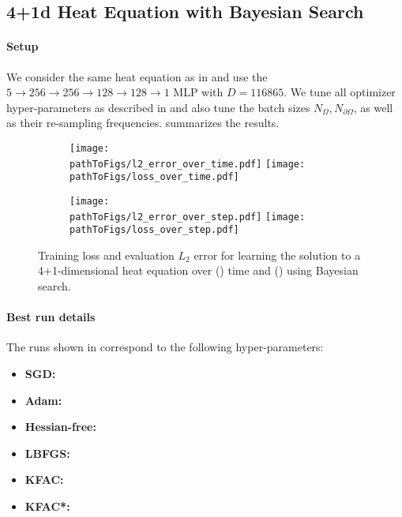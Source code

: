 \subsection{4+1d Heat Equation with Bayesian Search}\label{sec:4d-heat-bayes-app}

\paragraph{Setup} We consider the same heat equation as in  and use the $5 \to 256 \to 256\to 128 \to 128 \to 1$ MLP with $D=\num{116865}$.
We tune all optimizer hyper-parameters as described in  and also tune the batch sizes $N_{\Omega}, N_{\partial \Omega}$, as well as their re-sampling frequencies.
 summarizes the results.

\begin{figure}[!h]
  \centering
  \def\pathToFigs{../kfac_pinns_exp/exp31_heat4d_mlp_tanh_256_bayes}
  \begin{subfigure}[t]{1.0\linewidth}
    \caption{}\label{subfig:heat4d-bayes-time}
    \texttt{[image: \\pathToFigs/l2\_error\_over\_time.pdf]}
    \texttt{[image: \\pathToFigs/loss\_over\_time.pdf]}
  \end{subfigure}
  \begin{subfigure}[t]{1.0\linewidth}
    \caption{}\label{subfig:heat4d-bayes-step}
    \texttt{[image: \\pathToFigs/l2\_error\_over\_step.pdf]}
    \texttt{[image: \\pathToFigs/loss\_over\_step.pdf]}
  \end{subfigure}
  \caption{Training loss and evaluation $L_2$ error for learning the solution to a 4+1-dimensional heat equation over () time and () using Bayesian search.}\label{fig:heat4d-bayes-appendix}
\end{figure}

\paragraph{Best run details}
The runs shown in  correspond to the following hyper-parameters:
\begin{itemize}
  \def\pathToRuns{../kfac_pinns_exp/exp31_heat4d_mlp_tanh_256_bayes/tex/}
\item \textbf{SGD:} 
\item \textbf{Adam:} 
\item \textbf{Hessian-free:} 
\item \textbf{LBFGS:} 
\item \textbf{KFAC:} 
\item \textbf{KFAC*:} 
\end{itemize}

